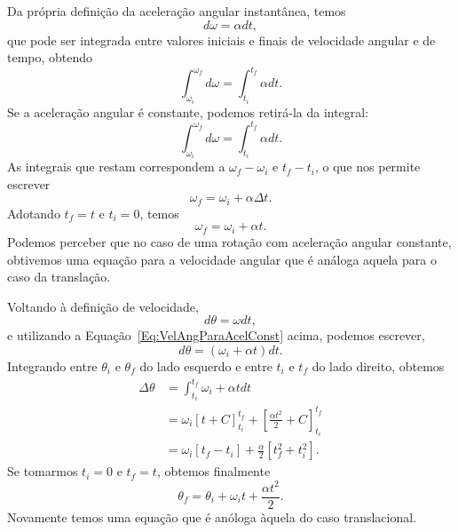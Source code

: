 Da própria definição da aceleração angular instantânea, temos
\begin{equation}
	d\omega = \alpha dt,
\end{equation}
%
que pode ser integrada entre valores iniciais e finais de velocidade angular e de tempo, obtendo
\begin{equation}
	\int_{\omega_i}^{\omega_f} d\omega = \int_{t_i}^{t_f} \alpha dt.
\end{equation}
%
Se a aceleração angular é constante, podemos retirá-la da integral:
\begin{equation}
		\int_{\omega_i}^{\omega_f} d\omega = \int_{t_i}^{t_f} \alpha dt.
\end{equation}
%
As integrais que restam correspondem a $\omega_f - \omega_i$ e $t_f - t_i$, o que nos permite escrever
\begin{equation}
	\omega_f = \omega_i + \alpha\Delta t.
\end{equation}
%
Adotando $t_f = t$ e $t_i = 0$, temos 
\begin{equation}\label{Eq:VelAngParaAcelConst}
	\omega_f = \omega_i + \alpha t.
\end{equation}
%
Podemos perceber que no caso de uma rotação com aceleração angular constante, obtivemos uma equação para a velocidade angular que é análoga aquela para o caso da translação.

Voltando à definição de velocidade, 
\begin{equation}
	d\theta = \omega dt,
\end{equation}
%
e utilizando a Equação~\ref{Eq:VelAngParaAcelConst} acima, podemos escrever,
\begin{equation}
	d\theta = (\omega_i + \alpha t) dt.
\end{equation}
%
Integrando entre $\theta_i$ e $\theta_f$ do lado esquerdo e entre $t_i$ e $t_f$ do lado direito, obtemos
\begin{align}
	\Delta \theta &= \int_{t_i}^{t_f} \omega_i + \alpha t dt \\
	&= \omega_i [t + C]_{t_i}^{t_f} + \left[\frac{\alpha t^2}{2} + C\right]_{t_i}^{t_f} \\
	&= \omega_i[t_f - t_i] + \frac{\alpha}{2}[t_f^2 + t_i^2].
\end{align}
%
Se tomarmos $t_i = 0$ e $t_f = t$, obtemos finalmente
\begin{equation}
	\theta_f = \theta_i + \omega_i t +\frac{\alpha t^2}{2}.
\end{equation}
%
Novamente temos uma equação que é anóloga àquela do caso translacional.
	
